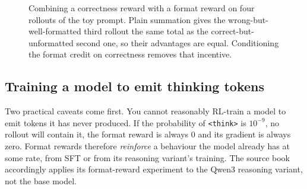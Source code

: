 \begin{figure}[ht]
\centering
{}
\caption{Combining a correctness reward with a format reward on four rollouts of the toy
prompt. Plain summation gives the wrong-but-well-formatted third rollout the same total as
the correct-but-unformatted second one, so their advantages are equal. Conditioning the
format credit on correctness removes that incentive.}
\label{fig:grpo2:formatfig}
\end{figure}

\subsection{Training a model to emit thinking tokens}\label{sec:grpo2:formattrain}

Two practical caveats come first. You cannot reasonably RL-train a model to emit tokens it
has never produced. If the probability of \verb|<think>| is $10^{-9}$, no rollout will contain it,
the format reward is always 0 and its gradient is always zero. Format rewards therefore
\emph{reinforce} a behaviour the model already has at some rate, from SFT or from its reasoning
variant's training. The source book accordingly applies its format-reward experiment to the
Qwen3 reasoning variant, not the base model.

